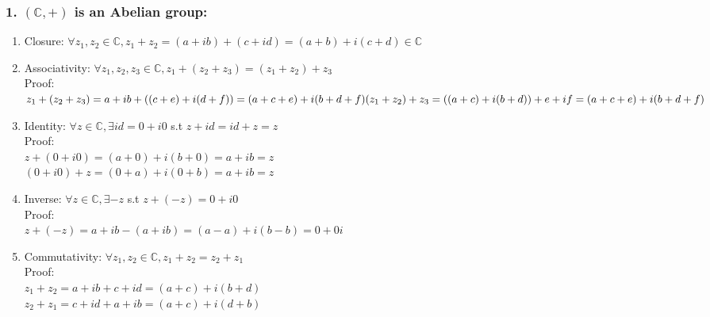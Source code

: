 \documentclass[11pt]{article}
\begin{document}
\subsubsection*{\textbf{1. }$(\mathbb{C}, +)$ is an Abelian group:}
\begin{enumerate}
    \item Closure: $\forall z_1,z_2 \in \mathbb{C}, z_1+z_2 =(a+ib)+(c+id) = (a+b)+i(c+d) \in \mathbb{C}$
    \item Associativity: $\forall z_1,z_2,z_3 \in \mathbb{C},z_1+(z_2+z_3)=(z_1+z_2)+z_3$\\
    Proof:\\
    $z_1+(z_2+z_3)=a+ib+((c+e)+i(d+f))=(a+c+e)+i(b+d+f)\\(z_1+z_2)+z_3=((a+c)+i(b+d))+e+if=(a+c+e)+i(b+d+f)$
    \item Identity: $\forall z \in \mathbb{C}, \exists id=0+i0$ s.t $z+id=id+z=z$\\
    Proof:\\
    $z+(0+i0)=(a+0)+i(b+0)=a+ib=z$\\
    $(0+i0)+z=(0+a)+i(0+b)=a+ib=z$
    \item Inverse: $\forall z \in \mathbb{C}, \exists -z$ s.t $z+(-z)=0+i0$\\
    Proof:\\
    $z+(-z)=a+ib-(a+ib)=(a-a)+i(b-b)=0+0i$
    \item Commutativity: $\forall z_1,z_2 \in \mathbb{C}, z_1+z_2=z_2+z_1$\\
    Proof:\\
    $z_1+z_2=a+ib+c+id=(a+c)+i(b+d)$\\
    $z_2+z_1=c+id+a+ib=(a+c)+i(d+b)$\\
\end{enumerate}
​
\end{document}
